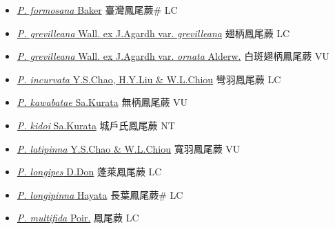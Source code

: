 \begin{itemize}
\begin{itemize}
        \item[] \href{http://www.theplantlist.org/tpl1.1/search?q=Pteris+formosana}{\textit{P. formosana} Baker}   臺灣鳳尾蕨\# LC
        \item[] \href{http://www.theplantlist.org/tpl1.1/search?q=Pteris+grevilleana+var.+grevilleana}{\textit{P. grevilleana} Wall. ex J.Agardh var. \textit{grevilleana}}   翅柄鳳尾蕨 LC
        \item[] \href{http://www.theplantlist.org/tpl1.1/search?q=Pteris+grevilleana+var.+ornata}{\textit{P. grevilleana} Wall. ex J.Agardh var. \textit{ornata} Alderw.}   白斑翅柄鳳尾蕨 VU
        \item[] \href{http://www.theplantlist.org/tpl1.1/search?q=Pteris+incurvata}{\textit{P. incurvata} Y.S.Chao, H.Y.Liu \& W.L.Chiou}   彎羽鳳尾蕨 LC
        \item[] \href{http://www.theplantlist.org/tpl1.1/search?q=Pteris+kawabatae}{\textit{P. kawabatae} Sa.Kurata}   無柄鳳尾蕨 VU
        \item[] \href{http://www.theplantlist.org/tpl1.1/search?q=Pteris+kidoi}{\textit{P. kidoi} Sa.Kurata}   城戶氏鳳尾蕨 NT
        \item[] \href{http://www.theplantlist.org/tpl1.1/search?q=Pteris+latipinna}{\textit{P. latipinna} Y.S.Chao \& W.L.Chiou}   寬羽鳳尾蕨 VU
        \item[] \href{http://www.theplantlist.org/tpl1.1/search?q=Pteris+longipes}{\textit{P. longipes} D.Don}   蓬萊鳳尾蕨 LC
        \item[] \href{http://www.theplantlist.org/tpl1.1/search?q=Pteris+longipinna}{\textit{P. longipinna} Hayata}   長葉鳳尾蕨\# LC
        \item[] \href{http://www.theplantlist.org/tpl1.1/search?q=Pteris+multifida}{\textit{P. multifida} Poir.}   鳳尾蕨 LC

\end{itemize}
\end{itemize}
